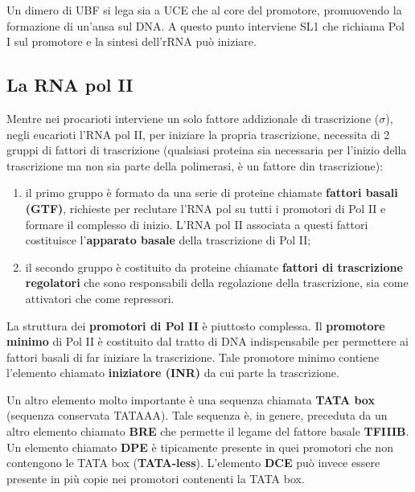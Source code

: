 \documentclass[11pt]{book}
\begin{document}
Un dimero di UBF si lega sia a UCE che al core del promotore,
promuovendo la formazione di un'ansa sul DNA. A questo punto interviene
SL1 che richiama Pol I sul promotore e la sintesi dell'rRNA può
iniziare.

\subsection{La RNA pol II}\label{la-rna-pol-ii}

Mentre nei procarioti interviene un solo fattore addizionale di
trascrizione (\(\sigma\)), negli eucarioti l'RNA pol II, per iniziare la
propria trascrizione, necessita di 2 gruppi di fattori di trascrizione
(qualsiasi proteina sia necessaria per l'inizio della trascrizione ma
non sia parte della polimerasi, è un fattore din trascrizione):

\begin{enumerate}
\def\labelenumi{\arabic{enumi}.}
\itemsep1pt\parskip0pt
\item
  il primo gruppo è formato da una serie di proteine chiamate
  \textbf{fattori basali (GTF)}, richieste per reclutare l'RNA pol su
  tutti i promotori di Pol II e formare il complesso di inizio. L'RNA
  pol II associata a questi fattori costituisce l'\textbf{apparato
  basale} della trascrizione di Pol II;
\item
  il secondo gruppo è costituito da proteine chiamate \textbf{fattori di
  trascrizione regolatori} che sono responsabili della regolazione della
  trascrizione, sia come attivatori che come repressori.
\end{enumerate}

La struttura dei \textbf{promotori di Pol II} è piuttosto complessa. Il
\textbf{promotore minimo} di Pol II è costituito dal tratto di DNA
indispensabile per permettere ai fattori basali di far iniziare la
trascrizione. Tale promotore minimo contiene l'elemento chiamato
\textbf{iniziatore (INR)} da cui parte la trascrizione.

Un altro elemento molto importante è una sequenza chiamata \textbf{TATA
box} (sequenza conservata TATAAA). Tale sequenza è, in genere, preceduta
da un altro elemento chiamato \textbf{BRE} che permette il legame del
fattore basale \textbf{TFIIIB}. Un elemento chiamato \textbf{DPE} è
tipicamente presente in quei promotori che non contengono le TATA box
(\textbf{TATA-less}). L'elemento \textbf{DCE} può invece essere presente in
più copie nei promotori contenenti la TATA box.
\end{document}
